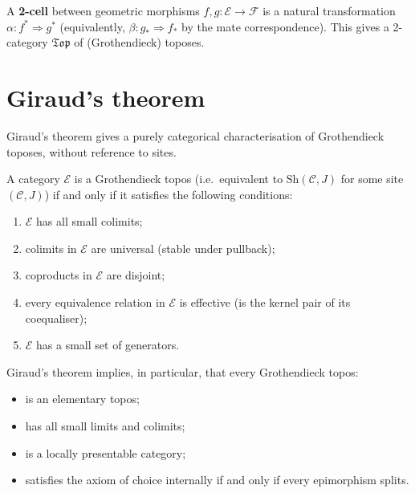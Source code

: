 \begin{definition}\label{def:geom-morph-cats}
A \textbf{2-cell} between geometric morphisms $f,g\colon\mathcal{E}\to\mathcal{F}$
is a natural transformation $\alpha\colon f^*\Rightarrow g^*$ (equivalently,
$\beta\colon g_*\Rightarrow f_*$ by the mate correspondence).  This gives
a 2-category $\mathfrak{Top}$ of (Grothendieck) toposes.
\end{definition}



\section{Giraud's theorem}\label{sec:giraud}


Giraud's theorem gives a purely categorical characterisation of
Grothendieck toposes, without reference to sites.

\begin{theorem}[Giraud]\label{thm:giraud}
A category $\mathcal{E}$ is a Grothendieck topos (i.e.\ equivalent to
$\mathrm{Sh}(\mathcal{C},J)$ for some site $(\mathcal{C},J)$)
if and only if it satisfies the following conditions:
\begin{enumerate}[label=(\roman*)]
\item $\mathcal{E}$ has all small colimits;
\item colimits in $\mathcal{E}$ are universal (stable under pullback);
\item coproducts in $\mathcal{E}$ are disjoint;
\item every equivalence relation in $\mathcal{E}$ is effective
      (is the kernel pair of its coequaliser);
\item $\mathcal{E}$ has a small set of generators.
\end{enumerate}
\end{theorem}

\begin{remark}\label{rem:giraud-consequences}
Giraud's theorem implies, in particular, that every Grothendieck topos:
\begin{itemize}
\item is an elementary topos;
\item has all small limits and colimits;
\item is a locally presentable category;
\item satisfies the axiom of choice internally if and only if every
      epimorphism splits.
\end{itemize}
\end{remark}

